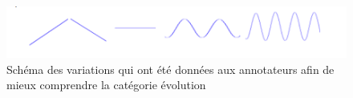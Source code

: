 \begin{figure}
  \centering
  \includegraphics[width=14cm]{./Chapitre4/figures/variation.png}
  \caption{Schéma des variations qui ont été données aux annotateurs afin de mieux comprendre la catégorie évolution}
  \label{fig:variation}
\end{figure}
